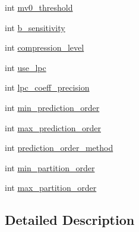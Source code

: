 \begin{DoxyCompactItemize}
\item 
int \hyperlink{struct_tao_1_1_f_fmpeg_1_1_f_fmpeg_1_1_a_v_codec_context_afc033e4f7de2930d3a6ad7d8cae1f8b6}{mv0\_\-threshold}
\item 
int \hyperlink{struct_tao_1_1_f_fmpeg_1_1_f_fmpeg_1_1_a_v_codec_context_adb981afbdb7764f5c573c017554f0f3b}{b\_\-sensitivity}
\item 
int \hyperlink{struct_tao_1_1_f_fmpeg_1_1_f_fmpeg_1_1_a_v_codec_context_aa679758d208754580810ff13e60052cb}{compression\_\-level}
\item 
int \hyperlink{struct_tao_1_1_f_fmpeg_1_1_f_fmpeg_1_1_a_v_codec_context_a086438e6661e3c24c1b74f865861394e}{use\_\-lpc}
\item 
int \hyperlink{struct_tao_1_1_f_fmpeg_1_1_f_fmpeg_1_1_a_v_codec_context_a9e10bf5598d185c7df9399751a1141cf}{lpc\_\-coeff\_\-precision}
\item 
int \hyperlink{struct_tao_1_1_f_fmpeg_1_1_f_fmpeg_1_1_a_v_codec_context_aedf3ce090f99052ddb6199f170b68f2b}{min\_\-prediction\_\-order}
\item 
int \hyperlink{struct_tao_1_1_f_fmpeg_1_1_f_fmpeg_1_1_a_v_codec_context_a8aefc7869e8ca3350d64b0e212b1933e}{max\_\-prediction\_\-order}
\item 
int \hyperlink{struct_tao_1_1_f_fmpeg_1_1_f_fmpeg_1_1_a_v_codec_context_aff9132cb106ba32c1939271160790d08}{prediction\_\-order\_\-method}
\item 
int \hyperlink{struct_tao_1_1_f_fmpeg_1_1_f_fmpeg_1_1_a_v_codec_context_a7263871881929d1b5ccc21f509bfeee1}{min\_\-partition\_\-order}
\item 
int \hyperlink{struct_tao_1_1_f_fmpeg_1_1_f_fmpeg_1_1_a_v_codec_context_a3ae9ad7a8994e190701ffe68f876d616}{max\_\-partition\_\-order}
\end{DoxyCompactItemize}


\subsection{Detailed Description}


